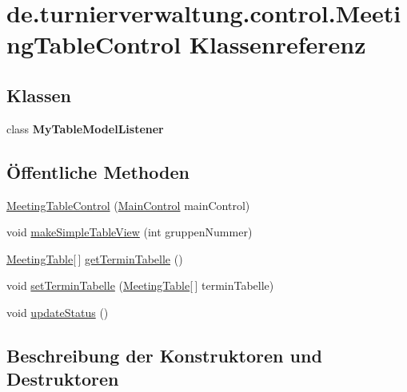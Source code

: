 \hypertarget{classde_1_1turnierverwaltung_1_1control_1_1_meeting_table_control}{}\section{de.\+turnierverwaltung.\+control.\+Meeting\+Table\+Control Klassenreferenz}
\label{classde_1_1turnierverwaltung_1_1control_1_1_meeting_table_control}
\subsection*{Klassen}
\begin{DoxyCompactItemize}
\item 
class {\bfseries My\+Table\+Model\+Listener}
\end{DoxyCompactItemize}
\subsection*{Öffentliche Methoden}
\begin{DoxyCompactItemize}
\item 
\hyperlink{classde_1_1turnierverwaltung_1_1control_1_1_meeting_table_control_a7af8389f685ad599b4cd61862e7ac75d}{Meeting\+Table\+Control} (\hyperlink{classde_1_1turnierverwaltung_1_1control_1_1_main_control}{Main\+Control} main\+Control)
\item 
void \hyperlink{classde_1_1turnierverwaltung_1_1control_1_1_meeting_table_control_a6f9898a1e5010fee6925561c5266e351}{make\+Simple\+Table\+View} (int gruppen\+Nummer)
\item 
\hyperlink{classde_1_1turnierverwaltung_1_1model_1_1_meeting_table}{Meeting\+Table}\mbox{[}$\,$\mbox{]} \hyperlink{classde_1_1turnierverwaltung_1_1control_1_1_meeting_table_control_adfed19cac0420cbd941b197e214c0edf}{get\+Termin\+Tabelle} ()
\item 
void \hyperlink{classde_1_1turnierverwaltung_1_1control_1_1_meeting_table_control_adefacd3d1dbe64447e377ce218d0ac3a}{set\+Termin\+Tabelle} (\hyperlink{classde_1_1turnierverwaltung_1_1model_1_1_meeting_table}{Meeting\+Table}\mbox{[}$\,$\mbox{]} termin\+Tabelle)
\item 
void \hyperlink{classde_1_1turnierverwaltung_1_1control_1_1_meeting_table_control_abdec47d942cb0c37abe5ffe2dd098fcb}{update\+Status} ()
\end{DoxyCompactItemize}


\subsection{Beschreibung der Konstruktoren und Destruktoren}
